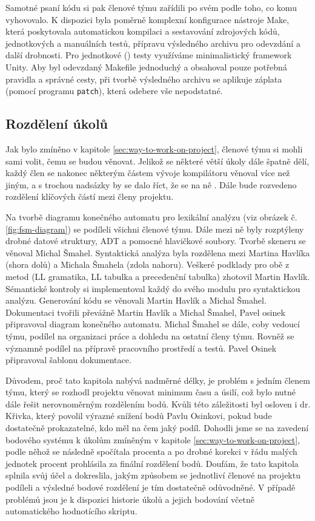 \documentclass[11pt,a4paper]{article}
\begin{document}
Samotné psaní kódu si pak členové týmu zařídili po svém podle toho, co komu vyhovovalo. K dispozici byla poměrně komplexní konfigurace nástroje Make\cite{make-official-docs}\cite{make-cheatsheet}, která poskytovala automatickou kompilaci a sestavování zdrojových kódů, jednotkových a manuálních testů, přípravu výsledného archivu pro odevzdání a další drobnosti. Pro jednotkové () testy využíváme minimalistický framework Unity\cite{unity}. Aby byl odevzdaný Makefile jednoduchý a obsahoval pouze potřebná pravidla a správné cesty, při tvorbě výsledného archivu se aplikuje záplata (pomocí programu \texttt{patch}), která odebere vše nepodstatné.

\subsection{Rozdělení úkolů}
\label{sec:tasks-division}

Jak bylo zmíněno v kapitole \ref{sec:way-to-work-on-project}, členové týmu si mohli sami volit, čemu se budou věnovat. Jelikož se některé větší úkoly dále špatně dělí, každý člen se nakonec některým částem vývoje kompilátoru věnoval více než jiným, a s trochou nadsázky by se dalo říct, že se na ně . Dále bude rozvedeno rozdělení klíčových částí mezi členy projektu.

Na tvorbě diagramu konečného automatu pro lexikální analýzu (viz obrázek č. \ref{fig:fsm-diagram}) se podíleli všichni členové týmu. Dále mezi ně byly rozptýleny drobné datové struktury, ADT a pomocné hlavičkové soubory. Tvorbě skeneru se věnoval Michal Šmahel. Syntaktická analýza byla rozdělena mezi Martina Havlíka (shora dolů) a Michala Šmahela (zdola nahoru). Veškeré podklady pro obě z metod (LL gramatika, LL tabulka a precedenční tabulka) zhotovil Martin Havlík. Sémantické kontroly si implementoval každý do svého modulu pro syntaktickou analýzu. Generování kódu se věnovali Martin Havlík a Michal Šmahel. Dokumentaci tvořili převážně Martin Havlík a Michal Šmahel, Pavel osinek připravoval diagram konečného automatu. Michal Šmahel se dále, coby vedoucí týmu, podílel na organizaci práce a dohledu na ostatní členy týmu. Rovněž se významně podílel na přípravě pracovního prostředí a testů. Pavel Osinek připravoval šablonu dokumentace.

Důvodem, proč tato kapitola nabývá nadměrné délky, je problém s jedním členem týmu, který se rozhodl projektu věnovat minimum času a úsilí, což bylo nutné dále řešit nerovnoměrným rozdělením bodů. Kvůli této záležitosti byl osloven i dr. Křivka, který povolil výrazné snížení bodů Pavlu Osinkovi, pokud bude dostatečně prokazatelné, kdo měl na čem jaký podíl. Dohodli jsme se na zavedení bodového systému k úkolům zmíněným v kapitole \ref{sec:way-to-work-on-project}, podle něhož se následně spočítala procenta a po drobné korekci v řádu malých jednotek procent prohlásila za finální rozdělení bodů. Doufám, že tato kapitola splnila svůj účel a dokreslila, jakým způsobem se jednotliví členové na projektu podíleli a výsledné bodové rozdělení je tím dostatečně odůvodněné. V případě problémů jsou je k dispozici historie úkolů a jejich bodování včetně automatického hodnotícího skriptu.
\end{document}
